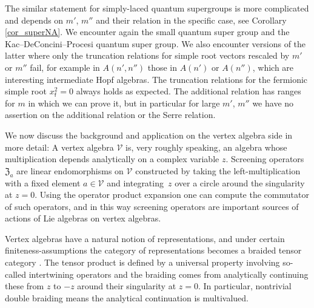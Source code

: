 \documentclass[10pt,a4paper]{amsart}
\numberwithin{equation}{section}
\newcommand{\zem}{\mathfrak{Z}}
\newcommand{\f}{\mathsf{f}}
\begin{document}
The similar statement for simply-laced quantum supergroups is more complicated and depends on $m'$, $m''$ and their relation in the specific case, see Corollary \ref{cor_superNA}. We encounter again the small quantum super group and the Kac--DeConcini--Procesi quantum super group. We also encounter versions of the latter where only the truncation relations for simple root vectors rescaled by $m'$ or $m''$ fail, for example in $A(n',n'')$ those in $A(n')$ or $A(n'')$, which are interesting intermediate Hopf algebras. The truncation relations for the fermionic simple root $x_\f^2=0$ always holds as expected. The additional relation has ranges for $m$ in which we can prove it, but in particular for large $m'$, $m''$ we have no assertion on the additional relation or the Serre relation.

We now discuss the background and application on the vertex algebra side in more detail: A vertex algebra $\mathcal{V}$ \cite{FBZ04, Kac98} is, very roughly speaking, an algebra whose multiplication depends analytically on a complex variable $z$.
Screening operators $\zem_a$ are linear endomorphisms on $\mathcal{V}$ constructed by taking the left-multiplication with a fixed element $a\in\mathcal{V}$ and integrating~$z$ over a circle around the singularity at $z=0$. Using the operator product expansion one can compute the commutator of such operators, and in this way screening operators are important sources of actions of Lie algebras on vertex algebras.

Vertex algebras have a natural notion of representations, and under certain fi\-ni\-te\-ness-as\-sump\-tions the category of representations becomes a braided tensor category \cite{HLZ06}. The tensor product is defined by a universal property involving so-called intertwining operators and the braiding comes from analytically continuing these from $z$ to $-z$ around their singularity at $z=0$. In particular, nontrivial double braiding means the analytical continuation is multivalued.
\end{document}
